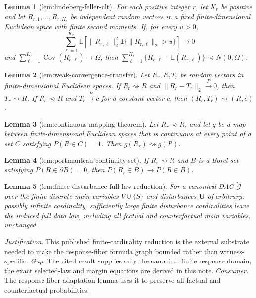 \documentclass{article}
\newtheorem{lemma}{Lemma}
\begin{document}
\begin{lemma}[lem:lindeberg-feller-clt]\label{lem:lindeberg-feller-clt}
For each positive integer \(r\), let \(K_r\) be positive and let \(R_{r,1},\ldots,R_{r,K_r}\) be independent random vectors in a fixed finite-dimensional Euclidean space with finite second moments. If, for every \(u>0\), \[\sum_{\ell=1}^{K_r}\mathbb E\!\left[\|R_{r,\ell}\|_2^2\mathbf 1\{\|R_{r,\ell}\|_2>u\}\right]\longrightarrow0\] and \(\sum_{\ell=1}^{K_r}\operatorname{Cov}(R_{r,\ell})\to\Omega\), then \(\sum_{\ell=1}^{K_r}\{R_{r,\ell}-\mathbb E(R_{r,\ell})\}\rightsquigarrow N(0,\Omega)\).
\end{lemma}

\begin{lemma}[lem:weak-convergence-transfer]\label{lem:weak-convergence-transfer}
Let \(R_r,R,T_r\) be random vectors in finite-dimensional Euclidean spaces. If \(R_r\rightsquigarrow R\) and \(\|R_r-T_r\|_2\xrightarrow{P}0\), then \(T_r\rightsquigarrow R\). If \(R_r\rightsquigarrow R\) and \(T_r\xrightarrow{P}c\) for a constant vector \(c\), then \((R_r,T_r)\rightsquigarrow(R,c)\).
\end{lemma}

\begin{lemma}[lem:continuous-mapping-theorem]\label{lem:continuous-mapping-theorem}
Let \(R_r\rightsquigarrow R\), and let \(g\) be a map between finite-dimensional Euclidean spaces that is continuous at every point of a set \(C\) satisfying \(P(R\in C)=1\). Then \(g(R_r)\rightsquigarrow g(R)\).
\end{lemma}

\begin{lemma}[lem:portmanteau-continuity-set]\label{lem:portmanteau-continuity-set}
If \(R_r\rightsquigarrow R\) and \(B\) is a Borel set satisfying \(P(R\in\partial B)=0\), then \(P(R_r\in B)\to P(R\in B)\).
\end{lemma}

\begin{lemma}[lem:finite-disturbance-full-law-reduction]\label{lem:finite-disturbance-full-law-reduction}
For a canonical DAG \(\widetilde{\mathcal G}\) over the finite discrete main variables \(V\cup\{S\}\) and disturbances \(\mathbf U\) of arbitrary, possibly infinite cardinality, sufficiently large finite disturbance cardinalities leave the induced full data law, including all factual and counterfactual main variables, unchanged.
\end{lemma}
\par\smallskip\noindent \textit{Justification.} This published finite-cardinality reduction is the external substrate needed to make the response-fiber formula graph bounded rather than witness-specific. \textit{Gap.} The cited result supplies only the canonical finite response domain; the exact selected-law and margin equations are derived in this note. \textit{Consumer.} The response-fiber adaptation lemma uses it to preserve all factual and counterfactual probabilities.
\end{document}

